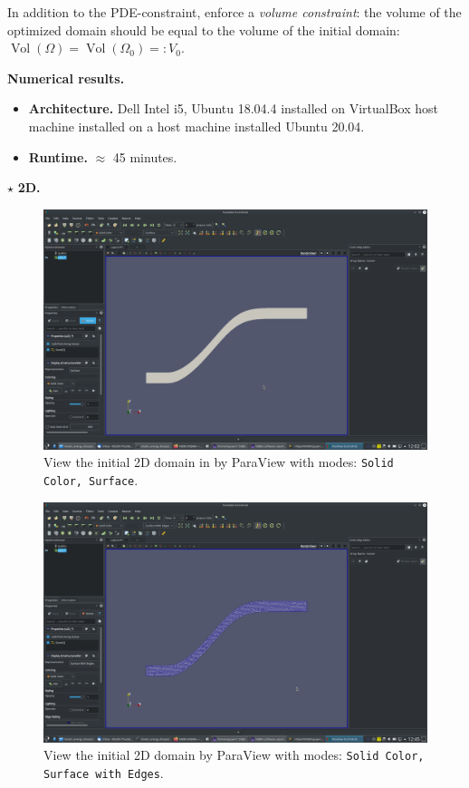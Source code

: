 \documentclass[onsided]{book}
\numberwithin{equation}{section}
\begin{document}
\begin{enumerate}
\begin{enumerate}
        In addition to the PDE-constraint, enforce a \textit{volume constraint}: the volume of the optimized domain should be equal to the volume of the initial domain: $\operatorname{Vol}(\Omega) = \operatorname{Vol}(\Omega_0) =: V_0$.
        
        \textbf{Numerical results.}
        \begin{itemize}
            \item \textbf{Architecture.} Dell Intel i5, Ubuntu 18.04.4 installed on VirtualBox host machine installed on a host machine installed Ubuntu 20.04.
            \item \textbf{Runtime.} $\approx$ 45 minutes.
        \end{itemize}
    
        $\star$ \textbf{2D.}
    
        \begin{figure}[H]
            \centering
            \includegraphics[height=0.44\textheight]{initial_domain_2D_Solid_Color_Surface}
            \caption{View the initial 2D domain in by ParaView with modes: \texttt{Solid Color, Surface}.}
        \end{figure}
        
        \begin{figure}[H]
            \centering
            \includegraphics[height=0.44\textheight]{initial_domain_2D_Solid_Color_Surface_with_Edges}
            \caption{View the initial 2D domain by ParaView with modes: \texttt{Solid Color, Surface with Edges}.}
        \end{figure}
        

\end{enumerate}
\end{enumerate}
\end{document}
